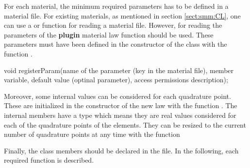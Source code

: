 For each material, the minimum required parameters has to be defined in a
material file.  For existing materials, as mentioned in section
\ref{sect:smm:CL}, one can use a  or 
function for reading a material file. However, for reading the parameters of the
\textbf{plugin} material law  function should be
used. These parameters must have been defined in the constructor of the class with the function .
\begin{cpp}
  void registerParam(name of the parameter (key in the material file),
		     member variable,
		     default value (optinal parameter),
		     access permissions
		     description);
\end{cpp}

Moreover, some internal values can be considered for each quadrature point.
These are initialized in the constructor of the new law with the
function . The
internal members have a  type which means they are real
values considered for each of the quadrature points of the
elements. They can be resized to the current number of quadrature points at any
time with the function

Finally, the class members should be declared in the 
file. In the following, each required function is described.

